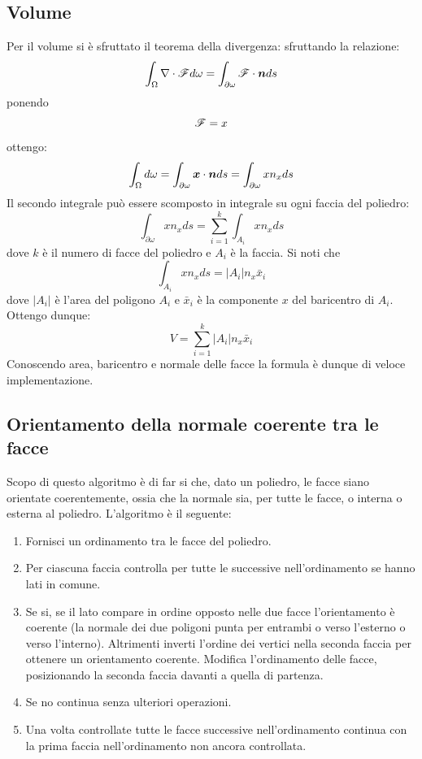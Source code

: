 \documentclass[oneside,12pt]{book}  %
\theoremstyle{plain}
\theoremstyle{definition}
\theoremstyle{remark}
\numberwithin{equation}{chapter} %
\begin{document}
\subsection{Volume}
Per il volume si \`e sfruttato il teorema della divergenza: sfruttando
la relazione:
$$ \int_\Omega \nabla \cdot \mathscr{F} d\omega=\int_{\partial\omega}\mathscr{F} \cdot
{\mbox{\boldmath$n$}} ds $$
ponendo $$\mathscr{F}=x$$ ottengo:
$$ \int_\Omega d\omega=\int_{\partial\omega} {\mbox{\boldmath$x$}} \cdot {\mbox{\boldmath$n$}} ds =\int_{\partial\omega} x  n_x ds $$
Il secondo integrale pu\`o essere scomposto in integrale su ogni
faccia del poliedro:
$$ \int_{\partial\omega} x n_x ds=\sum_{i=1}^k \int_{A_i} x n_x ds$$
dove $k$ \`e il numero di facce del poliedro e $A_i$ \`e la faccia.
Si noti che
$$\int_{A_i} x n_x ds= |A_i| n_x  \bar x_i $$
dove $|A_i|$ \`e l'area del poligono $A_i$ e $\bar x_i$ \`e la
componente $x$ del baricentro di $A_i$.
Ottengo dunque:
$$ V= \sum_{i=1}^k |A_i|  n_x \bar x_i $$
Conoscendo area, baricentro e normale delle facce la formula \`e dunque di
veloce implementazione.
 
\subsection{Orientamento della normale coerente tra le facce}
Scopo di questo algoritmo \`e di far si che, dato un poliedro, le
facce siano orientate coerentemente, ossia che la
normale sia, per tutte le facce, o interna o esterna al poliedro. L'algoritmo \`e il seguente:

\begin{enumerate}
\item Fornisci un ordinamento tra le facce del poliedro.
\item Per ciascuna faccia controlla per tutte le successive
  nell'ordinamento se hanno lati in comune.
\item Se si, se il lato compare in ordine opposto nelle due facce
  l'orientamento \`e coerente (la normale dei due poligoni punta per
  entrambi o verso l'esterno o verso l'interno). Altrimenti inverti l'ordine dei vertici
  nella seconda faccia per ottenere un orientamento coerente. Modifica l'ordinamento delle facce,
  posizionando la seconda faccia davanti a quella
  di partenza.

\item Se no continua senza ulteriori operazioni.

\item Una volta controllate tutte le facce successive nell'ordinamento
  continua con la prima faccia nell'ordinamento non ancora controllata.

\end{enumerate}
\end{document}
